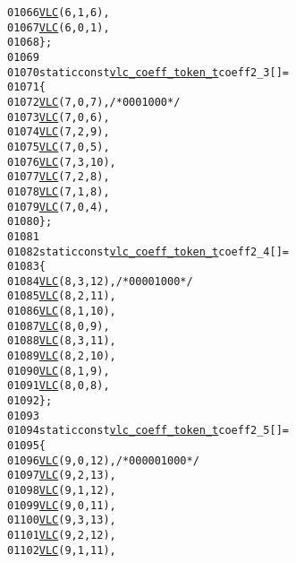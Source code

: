 \begin{footnotesize}
\begin{alltt}
01066         \hyperlink{vlc_8h_a7f3572774a720fd9b4bc3b1a0b65082f}{VLC}(6, 1, 6),
01067         \hyperlink{vlc_8h_a7f3572774a720fd9b4bc3b1a0b65082f}{VLC}(6, 0, 1),
01068 \};
01069 
01070 \textcolor{keyword}{static} \textcolor{keyword}{const} \hyperlink{structvlc__coeff__token__t}{vlc_coeff_token_t} coeff2\_3[] = 
01071 \{
01072         \hyperlink{vlc_8h_a7f3572774a720fd9b4bc3b1a0b65082f}{VLC}(7, 0, 7),   \textcolor{comment}{/* 0001 000 */}
01073         \hyperlink{vlc_8h_a7f3572774a720fd9b4bc3b1a0b65082f}{VLC}(7, 0, 6),
01074         \hyperlink{vlc_8h_a7f3572774a720fd9b4bc3b1a0b65082f}{VLC}(7, 2, 9),
01075         \hyperlink{vlc_8h_a7f3572774a720fd9b4bc3b1a0b65082f}{VLC}(7, 0, 5),
01076         \hyperlink{vlc_8h_a7f3572774a720fd9b4bc3b1a0b65082f}{VLC}(7, 3, 10),
01077         \hyperlink{vlc_8h_a7f3572774a720fd9b4bc3b1a0b65082f}{VLC}(7, 2, 8),
01078         \hyperlink{vlc_8h_a7f3572774a720fd9b4bc3b1a0b65082f}{VLC}(7, 1, 8),
01079         \hyperlink{vlc_8h_a7f3572774a720fd9b4bc3b1a0b65082f}{VLC}(7, 0, 4),
01080 \};
01081 
01082 \textcolor{keyword}{static} \textcolor{keyword}{const} \hyperlink{structvlc__coeff__token__t}{vlc_coeff_token_t} coeff2\_4[] = 
01083 \{
01084         \hyperlink{vlc_8h_a7f3572774a720fd9b4bc3b1a0b65082f}{VLC}(8, 3, 12),   \textcolor{comment}{/* 0000 1000 */}
01085         \hyperlink{vlc_8h_a7f3572774a720fd9b4bc3b1a0b65082f}{VLC}(8, 2, 11),
01086         \hyperlink{vlc_8h_a7f3572774a720fd9b4bc3b1a0b65082f}{VLC}(8, 1, 10),
01087         \hyperlink{vlc_8h_a7f3572774a720fd9b4bc3b1a0b65082f}{VLC}(8, 0, 9),
01088         \hyperlink{vlc_8h_a7f3572774a720fd9b4bc3b1a0b65082f}{VLC}(8, 3, 11),
01089         \hyperlink{vlc_8h_a7f3572774a720fd9b4bc3b1a0b65082f}{VLC}(8, 2, 10),
01090         \hyperlink{vlc_8h_a7f3572774a720fd9b4bc3b1a0b65082f}{VLC}(8, 1, 9),
01091         \hyperlink{vlc_8h_a7f3572774a720fd9b4bc3b1a0b65082f}{VLC}(8, 0, 8),
01092 \};
01093 
01094 \textcolor{keyword}{static} \textcolor{keyword}{const} \hyperlink{structvlc__coeff__token__t}{vlc_coeff_token_t} coeff2\_5[] = 
01095 \{
01096         \hyperlink{vlc_8h_a7f3572774a720fd9b4bc3b1a0b65082f}{VLC}(9, 0, 12),   \textcolor{comment}{/* 0000 0100 0 */}
01097         \hyperlink{vlc_8h_a7f3572774a720fd9b4bc3b1a0b65082f}{VLC}(9, 2, 13),
01098         \hyperlink{vlc_8h_a7f3572774a720fd9b4bc3b1a0b65082f}{VLC}(9, 1, 12),
01099         \hyperlink{vlc_8h_a7f3572774a720fd9b4bc3b1a0b65082f}{VLC}(9, 0, 11),
01100         \hyperlink{vlc_8h_a7f3572774a720fd9b4bc3b1a0b65082f}{VLC}(9, 3, 13),
01101         \hyperlink{vlc_8h_a7f3572774a720fd9b4bc3b1a0b65082f}{VLC}(9, 2, 12),
01102         \hyperlink{vlc_8h_a7f3572774a720fd9b4bc3b1a0b65082f}{VLC}(9, 1, 11),

\end{alltt}
\end{footnotesize}

